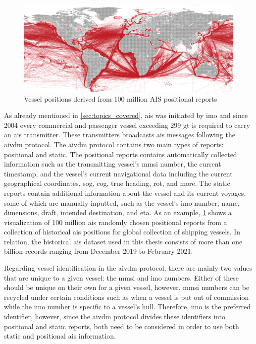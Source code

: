 \begin{figure}[htbp]  %
    \centering
    \includegraphics[width=1.0\textwidth]{figures/ais_history}
    \caption{Vessel positions derived from 100 million AIS positional reports}
    \label{fig:ais_positions}
\end{figure}

As already mentioned in \cref{sec:topics_covered}, \acrfull{ais} was initiated by \acrfull{imo} and since 2004 every commercial and passenger vessel exceeding 299 \acrfull{gt} is required to carry an \acrshort{ais} transmitter. These transmitters broadcasts \acrshort{ais} messages following the \gls{aivdm} protocol. The \gls{aivdm} protocol contains two main types of reports: positional and static. The positional reports contains automatically collected information such as the transmitting vessel's \acrfull{mmsi} number, the current timestamp, and the vessel's current navigational data including the current geographical coordinates, \acrfull{sog}, \acrfull{cog}, true heading, \acrfull{rot}, and more. The static reports contain additional information about the vessel and its current voyages, some of which are manually inputted, such as the vessel's \acrshort{imo} number, name, dimensions, draft, intended destination, and \acrfull{eta}. As an example, \cref{fig:ais_positions} shows a visualization of 100 million \acrshort{ais} randomly chosen positional reports from a collection of historical \acrshort{ais} positions for global collection of shipping vessels. In relation, the historical \acrshort{ais} dataset used in this thesis consists of more than one billion records ranging from December 2019 to February 2021.

Regarding vessel identification in the \gls{aivdm} protocol, there are mainly two values that are unique to a given vessel: the \acrshort{mmsi} and \acrshort{imo} numbers. Either of these should be unique on their own for a given vessel, however, \acrshort{mmsi} numbers can be recycled under certain conditions such as when a vessel is put out of commission while the \acrshort{imo} number is specific to a vessel's hull. Therefore, \acrshort{imo} is the preferred identifier, however, since the \gls{aivdm} protocol divides these identifiers into positional and static reports, both need to be considered in order to use both static and positional \acrshort{ais} information.

